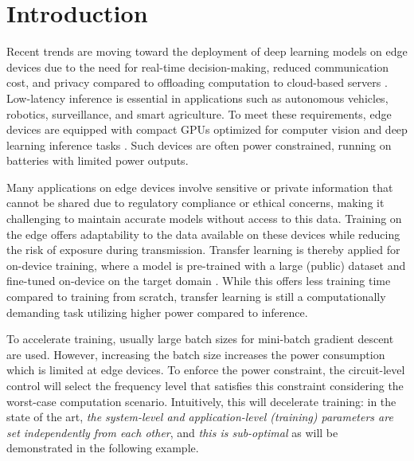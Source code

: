 \section{Introduction}

Recent trends are moving toward the deployment of deep learning models on edge devices due to the need for real-time decision-making, reduced communication cost, and privacy compared to offloading computation to cloud-based servers \cite{object_detection_on_mobile, dl_on_mobile, dl_on_edge_survey, object_detection_edge}. Low-latency inference is essential in applications such as autonomous vehicles, robotics, surveillance, and smart agriculture. To meet these requirements, edge devices are equipped with compact GPUs optimized for computer vision and deep learning inference tasks \cite{embedded_gpus, pedestrian_gpus, agriculture_gpus, object_tracking, lstm_mobile_gpus, object_detection_edge}. Such devices are often power constrained, running on batteries with limited power outputs. 


Many applications on edge devices involve sensitive or private information that cannot be shared due to regulatory compliance or ethical concerns, making it challenging to maintain accurate models without access to this data. %
Training on the edge offers adaptability to the data available on these devices while reducing the risk of exposure during transmission. Transfer learning is thereby applied for on-device training, where a model is pre-trained with a large (public) dataset and fine-tuned on-device on the target domain \cite{tinyTL, MobileTL, under_256k_memory, on_device_gradient_filtering}. While this offers less training time compared to training from scratch, transfer learning is still a computationally demanding task utilizing higher power compared to inference.





To accelerate training, usually large batch sizes for mini-batch gradient descent are used. However, increasing the batch size increases the power consumption which is limited at edge devices. To enforce the power constraint, the circuit-level control will select the frequency level that satisfies this constraint considering the worst-case computation scenario. Intuitively, this will decelerate training: in the state of the art, \emph{the system-level and application-level (training) parameters are set independently from each other}, and \emph{this is sub-optimal} as will be demonstrated in the following example. 

